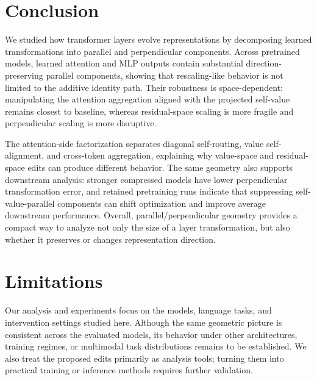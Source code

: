 \section{Conclusion}
\label{sec:conclusion}

We studied how transformer layers evolve representations by decomposing
learned transformations into parallel and perpendicular components. Across
pretrained models, learned attention and MLP outputs contain substantial
direction-preserving parallel components, showing that rescaling-like behavior
is not limited to the additive identity path. Their robustness is
space-dependent: manipulating the attention aggregation aligned with the
projected self-value remains closest to baseline, whereas residual-space
scaling is more fragile and perpendicular scaling is more disruptive.

The attention-side factorization separates diagonal self-routing, value
self-alignment, and cross-token aggregation, explaining why value-space and
residual-space edits can produce different behavior. The same geometry also
supports downstream analysis: stronger compressed models have lower
perpendicular transformation error, and retained pretraining runs indicate
that suppressing self-value-parallel components can shift optimization and
improve average downstream performance. Overall, parallel/perpendicular
geometry provides a compact way to analyze not only the size of a layer
transformation, but also whether it preserves or changes representation
direction.

\section{Limitations}
\label{sec:limitations}

Our analysis and experiments focus on the models, language tasks, and
intervention settings studied here. Although the same geometric picture is consistent
across the evaluated models, its behavior under other architectures, training
regimes, or multimodal task distributions remains to be established. We also
treat the proposed edits primarily as analysis tools; turning them into
practical training or inference methods requires further validation.
